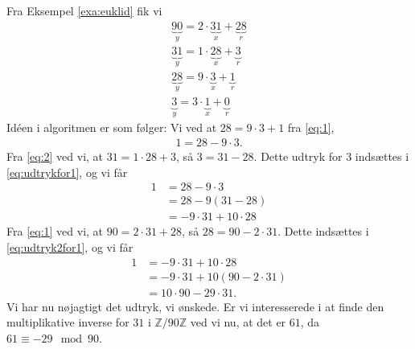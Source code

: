 \documentclass[12pt]{article}
\begin{document}
\begin{exa}
Fra Eksempel \ref{exa:euklid} fik vi
\begin{align}
\underbrace{90}_{y} = 2 \cdot \underbrace{31}_{x} + \underbrace{28}_{r}\label{eq:1} \\
\underbrace{31}_{y} = 1 \cdot \underbrace{28}_{x} + \underbrace{3}_{r}\label{eq:2} \\
\underbrace{28}_{y} = 9 \cdot \underbrace{3}_{x} + \underbrace{1}_{r}\label{eq:3} \\
\underbrace{3}_{y} = 3 \cdot \underbrace{1}_{x} + \underbrace{0}_{r} 
\end{align}
Idéen i algoritmen er som følger: Vi ved at $28 = 9\cdot 3 + 1$ fra \eqref{eq:1}, 
\begin{align}\label{eq:udtrykfor1}
1 = 28-9\cdot 3.
\end{align}
Fra \eqref{eq:2} ved vi, at $31 = 1\cdot 28+3$, så $3 = 31-28$. Dette udtryk for $3$ indsættes i \eqref{eq:udtrykfor1}, og vi får
\begin{align}
1 &= 28-9\cdot 3 \nonumber \\
&=28 -9(31-28) \nonumber \\
&= -9\cdot 31 + 10 \cdot 28 \label{eq:udtryk2for1}
\end{align} 
Fra \eqref{eq:1} ved vi, at $90 = 2 \cdot 31 + 28$, så $28 = 90-2\cdot 31$. Dette indsættes i \eqref{eq:udtryk2for1}, og vi får
\begin{align*}
1 &= -9\cdot 31 + 10 \cdot 28\\
  &= -9\cdot 31 + 10(90-2\cdot 31)\\
  &= 10\cdot 90 -29 \cdot 31.
\end{align*}
Vi har nu nøjagtigt det udtryk, vi ønskede. Er vi interesserede i at finde den multiplikative inverse for $31$ i $\mathbb{Z}/90\mathbb{Z}$ ved vi nu, at det er $61$, da $61 \equiv -29 \mod{90}$. 
\end{exa}
\end{document}
